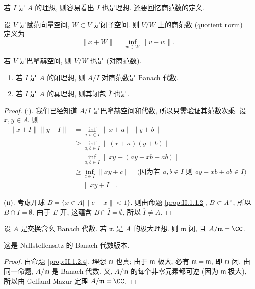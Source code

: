 若 $I$ 是 $A$ 的理想, 则容易看出 $\overline{I}$ 也是理想.
还要回忆商范数的定义.

\begin{definition}[商范数]
\label{def:II.1.2.3}
设 $V$ 是赋范向量空间, $W \subset V$ 是闭子空间. 则 $V/W$ 上的商范数 (quotient norm) 定义为
\[
\|x + W\| = \inf_{w \in W}\|v + w\|.
\]
\end{definition}

若 $V$ 是巴拿赫空间, 则 $V/W$ 也是 (对商范数).

\begin{proposition}
\label{prop:II.1.2.4}
\begin{enumerate}
\item[(i)] 若 $I$ 是 $A$ 的闭理想, 则 $A/I$ 对商范数是 Banach 代数.
\item[(ii)] 若 $I$ 是 $A$ 的真理想, 则其闭包 $\overline{I}$ 也是.
\end{enumerate}
\end{proposition}

\begin{proof}
(i). 我们已经知道 $A/I$ 是巴拿赫空间和代数, 所以只需验证其范数次乘. 设 $x, y \in A$. 则
\begin{align*}
\|x + I\|\|y + I\| &= \inf_{a,b \in I}\|x + a\|\|y + b\| \\
&\geq \inf_{a,b \in I}\|(x + a)(y + b)\| \\
&= \inf_{a,b \in I}\|xy + (ay + xb + ab)\| \\
&\geq \inf_{c \in I}\|xy + c\| \quad \text{(因为若 } a, b \in I \text{ 则 } ay + xb + ab \in I\text{)} \\
&= \|xy + I\|.
\end{align*}

(ii). 考虑开球 $B = \{x \in A \mid \|e - x\| < 1\}$. 则由命题 \ref{prop:II.1.1.2}, $B \subset A^{\times}$, 所以 $B \cap I = \emptyset$. 由于 $B$ 开, 这蕴含 $B \cap \overline{I} = \emptyset$, 所以 $\overline{I} \neq A$.
\end{proof}

\begin{corollary}[极大理想与 $\CC$]
\label{cor:II.1.2.5}
设 $A$ 是交换含幺 Banach 代数. 若 $\mathfrak{m}$ 是 $A$ 的极大理想, 则 $\mathfrak{m}$ 闭, 且 $A/\mathfrak{m} = \CC$.
\end{corollary}

这是 Nullstellensatz 的 Banach 代数版本.

\begin{proof}
由命题 \ref{prop:II.1.2.4}, 理想 $\overline{\mathfrak{m}}$ 也真; 由于 $\mathfrak{m}$ 极大, 必有 $\mathfrak{m} = \overline{\mathfrak{m}}$, 即 $\mathfrak{m}$ 闭. 由同一命题, $A/\mathfrak{m}$ 是 Banach 代数. 又, $A/\mathfrak{m}$ 的每个非零元素都可逆 (因为 $\mathfrak{m}$ 极大), 所以由 Gelfand-Mazur 定理 $A/\mathfrak{m} = \CC$.
\end{proof}

